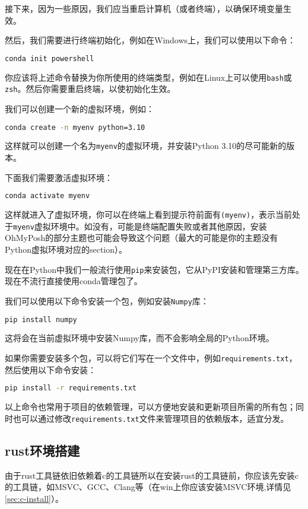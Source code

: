 \documentclass[../main.tex]{subfiles}
\begin{document}
接下来，因为一些原因，我们应当重启计算机（或者终端），以确保环境变量生效。

然后，我们需要进行终端初始化，例如在Windows上，我们可以使用以下命令：
\begin{lstlisting}[language=bash]
    conda init powershell
\end{lstlisting}

你应该将上述命令替换为你所使用的终端类型，例如在Linux上可以使用\texttt{bash}或\texttt{zsh}。然后你需要重启终端，以使初始化生效。

我们可以创建一个新的虚拟环境，例如：
\begin{lstlisting}[language=bash]
    conda create -n myenv python=3.10
\end{lstlisting}
这样就可以创建一个名为\texttt{myenv}的虚拟环境，并安装Python 3.10的尽可能新的版本。

下面我们需要激活虚拟环境：
\begin{lstlisting}[language=bash]
    conda activate myenv
\end{lstlisting}
这样就进入了虚拟环境，你可以在终端上看到提示符前面有\texttt{(myenv)}，表示当前处于\texttt{myenv}虚拟环境中。如没有，可能是终端配置失败或者其他原因，安装OhMyPosh的部分主题也可能会导致这个问题（最大的可能是你的主题没有Python虚拟环境对应的section）。

现在在Python中我们一般流行使用\texttt{pip}来安装包，它从PyPI安装和管理第三方库。现在不流行直接使用conda管理包了。

我们可以使用以下命令安装一个包，例如安装\texttt{Numpy}库：
\begin{lstlisting}[language=bash]
    pip install numpy
\end{lstlisting}
这将会在当前虚拟环境中安装Numpy库，而不会影响全局的Python环境。

如果你需要安装多个包，可以将它们写在一个文件中，例如\texttt{requirements.txt}，然后使用以下命令安装：
\begin{lstlisting}[language=bash]
    pip install -r requirements.txt
\end{lstlisting}
以上命令也常用于项目的依赖管理，可以方便地安装和更新项目所需的所有包；同时也可以通过修改\texttt{requirements.txt}文件来管理项目的依赖版本，适宜分发。

\subsection{rust环境搭建}

由于rust工具链依旧依赖着c的工具链所以在安装rust的工具链前，你应该先安装c的工具链，如MSVC、GCC、Clang等（在win上你应该安装MSVC环境,详情见\ref{sec:c-install}）。
\end{document}
